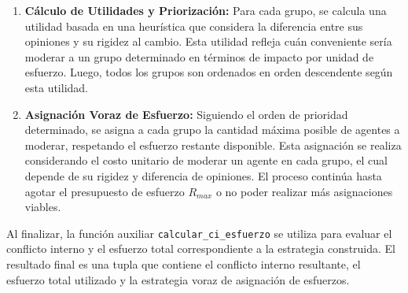 \documentclass[11pt,letter]{article}
\begin{document}
\begin{enumerate}
    \item \textbf{Cálculo de Utilidades y Priorización:} Para cada grupo, se calcula una utilidad basada en una heurística que considera la diferencia entre sus opiniones y su rigidez al cambio. Esta utilidad refleja cuán conveniente sería moderar a un grupo determinado en términos de impacto por unidad de esfuerzo. Luego, todos los grupos son ordenados en orden descendente según esta utilidad.

    \item \textbf{Asignación Voraz de Esfuerzo:} Siguiendo el orden de prioridad determinado, se asigna a cada grupo la cantidad máxima posible de agentes a moderar, respetando el esfuerzo restante disponible. Esta asignación se realiza considerando el costo unitario de moderar un agente en cada grupo, el cual depende de su rigidez y diferencia de opiniones. El proceso continúa hasta agotar el presupuesto de esfuerzo $R_{max}$ o no poder realizar más asignaciones viables.
\end{enumerate}

Al finalizar, la función auxiliar \texttt{calcular\_ci\_esfuerzo} se utiliza para evaluar el conflicto interno y el esfuerzo total correspondiente a la estrategia construida. El resultado final es una tupla que contiene el conflicto interno resultante, el esfuerzo total utilizado y la estrategia voraz de asignación de esfuerzos.
\end{document}

